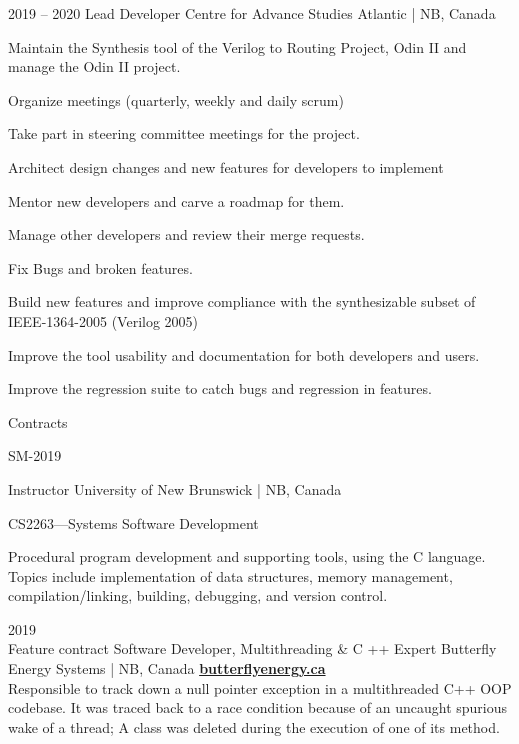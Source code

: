 \documentclass{developercv} %
\begin{document}
\entrys
{2019 -- 2020}
{Lead Developer}
{Centre for Advance Studies Atlantic | NB, Canada}{
	Maintain the Synthesis tool of the Verilog to Routing Project, Odin II and manage the Odin II project.
	\begin{tightemize}
		\item Organize meetings (quarterly, weekly and daily scrum)
		\item Take part in steering committee meetings for the project.
		\item Architect design changes and new features for developers to implement
		\item Mentor new developers and carve a roadmap for them.
		\item Manage other developers and review their merge requests.
		\item Fix Bugs and broken features.
		\item Build new features and improve compliance with the synthesizable subset of IEEE-1364-2005 (Verilog 2005)
		\item Improve the tool usability and documentation for both developers and users.
		\item Improve the regression suite to catch bugs and regression in features.
	\end{tightemize}
}

\entrys
{
	Contracts\\
	\begin{tightemize}
		\item[] {\footnotesize SM-2019}
	\end{tightemize}
}
{Instructor}
{University of New Brunswick | NB, Canada}
{
	\begin{tightemize}
		\item CS2263---Systems Software Development
		\begin{smallQuote}
			Procedural program development and supporting tools, using the C language.
			Topics include implementation of data structures, memory management, compilation/linking, building, debugging, and version control.
		\end{smallQuote}
	\end{tightemize}

}

\entrys
{2019 \\{\footnotesize Feature contract}}
{Software Developer, Multithreading \& C ++ Expert}
{Butterfly Energy Systems | NB, Canada}
{
	\textbf{\href{http://www.butterflyenergy.ca/home.php}{butterflyenergy.ca}}\\
	Responsible to track down a null pointer exception in a multithreaded C++ OOP codebase.
	It was traced back to a race condition because of an uncaught spurious wake of a thread; A class was deleted during the execution of one of its method.
}
\end{document}
